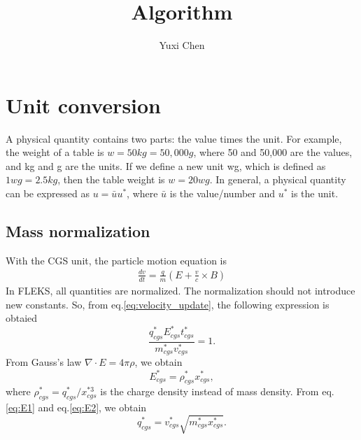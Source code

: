 \documentclass[a4paper, 11pt]{article}
\author{Yuxi Chen}
\title{Algorithm}
\begin{document}
\maketitle
\newpage

\section{Unit conversion}

A physical quantity contains two parts: the value times the unit. For example, the weight of a table is $w = 50 kg = 50,000 g$, where 50 and 50,000 are the values, and kg and g are the units. If we define a new unit wg, which is defined as $1 wg = 2.5 kg$, then the table weight is $w = 20 wg$. In general, a physical quantity can be expressed as $u = \bar{u} u^*$, where $\bar{u}$ is the value/number and $u^*$ is the unit.  

\subsection{Mass normalization}

With the CGS unit, the particle motion equation is
\begin{eqnarray}
\frac{dv}{dt} = \frac{q}{m}(E + \frac{v}{c} \times B) 
\label{eq:velocity_update}
\end{eqnarray}
In FLEKS, all quantities are normalized. The normalization should not introduce new constants. So, from eq.\ref{eq:velocity_update}, the following expression is obtaied
\begin{equation}
\frac{q_{cgs}^* E_{cgs}^* t_{cgs}^*}{m_{cgs}^* v_{cgs}^*} = 1.
\label{eq:E1}
\end{equation}
From Gauss's law $\nabla\cdot E = 4\pi \rho$, we obtain 
\begin{equation}
E_{cgs}^* = \rho_{cgs} ^*x_{cgs}^*,
\label{eq:E2}
\end{equation}
where $\rho_{cgs}^* = q_{cgs}^*/x_{cgs}^{*3}$ is the charge density instead of mass density. From eq.\ref{eq:E1} and eq.\ref{eq:E2}, we obtain 
\begin{equation}
q_{cgs}^*=v_{cgs}^* \sqrt{m_{cgs}^* x_{cgs}^*}.
\label{eq:q1}
\end{equation}
\end{document}
